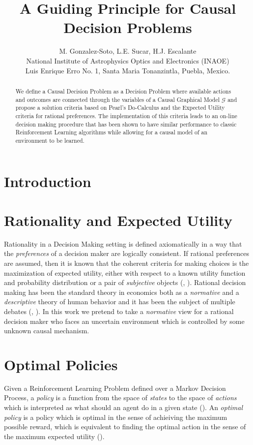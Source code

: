 \documentclass[letterpaper]{article} %
\title{A Guiding Principle for Causal Decision Problems}
\author{M. Gonzalez-Soto, L.E. Sucar, H.J. Escalante\\
National Institute of Astrophysics Optics and Electronics (INAOE)\\
Luis Enrique Erro No. 1, Santa Maria Tonanzintla, Puebla, Mexico.
}
\begin{document}
\maketitle
\begin{abstract}
We define a Causal Decision Problem as a Decision Problem where available actions and outcomes are connected through the variables of a Causal Graphical Model $\mathcal{G}$ and propose a solution criteria based on Pearl's Do-Calculus and the Expected Utility criteria for rational preferences. The implementation of this criteria leads to an on-line decision making procedure that has been shown to have similar performance to classic Reinforcement Learning algorithms while allowing for a causal model of an environment to be learned. 
\end{abstract}

\section{Introduction}
\noindent

\section{Rationality and Expected Utility}
Rationality in a Decision Making setting is defined axiomatically in a way that the \textit{preferences} of a decision maker are logically consistent. If rational preferences are assumed, then it is known that the coherent criteria for making choices is the maximization of expected utility, either with respect to a known utility function and probability distribution or a pair of \textit{subjective} objects (\cite{bernardo2000bayesian}, \cite{gilboa2009decision}). Rational decision making has been the standard theory in economics both as a \textit{normative} and a \textit{descriptive} theory of human behavior and it has been the subject of multiple debates (\cite{tversky1974judgment}, \cite{kahneman1982judgment}). In this work we pretend to take a \textit{normative} view for a rational decision maker who faces an uncertain environment which is controlled by some unknown causal mechanism.
\section{Optimal Policies}
Given a Reinforcement Learning Problem defined over a Markov Decision Process, a \textit{policy} is a function from the space of \textit{states} to the space of \textit{actions} which is interpreted as what should an agent do in a given state (\cite{sutton1998reinforcement}). An \textit{optimal policy} is a policy which is optimal in the sense of achieiving the maximum possible reward, which is equivalent to finding the optimal action in the sense of the maximum expected utility (\cite{webb2007game}).
\end{document}
